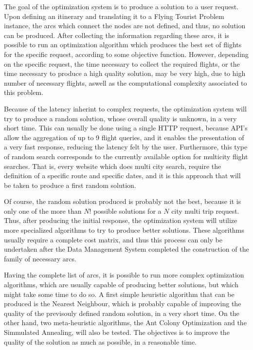 

The goal of the optimization system is to produce a solution to a user request.
Upon defining an itinerary and translating it to a Flying Tourist Problem instance, the arcs which connect the nodes are not defined, 
and thus, no solution can be produced.
After collecting the information regarding these arcs, it is possible to run 
an optimization algorithm which produces the best set of flights for the specific request,
according to some objective function.
However, depending on the specific request, the time necessary to collect 
the required flights, or the time necessary to produce a high quality solution, may be very high,
due to high number of necessary flights, aswell as the computational complexity associated to this problem.

Because of the latency inherint to complex requests,
the optimization system will try to produce a random solution, whose overall quality is unknown,
in a very short time. This can usually be done using a single HTTP request,
because API's allow the aggregation of up to 9 flight queries,
and it enables the presentation of a very fast response,
reducing the latency felt by the user.
Furthermore, this type of random search corresponds to the currently available option 
for multicity flight searches. That is, every website which does multi city search, 
require the definition of a specific route and specific dates,
and it is this approach that will be taken to produce a first random solution.

Of course, the random solution produced is probably not the best,
because it is only one of the more than $N!$ possible solutions for a $N$ city multi trip request.
Thus, after producing the initial response, the optimization system  
will utilize more specialized algorithms to try to produce better solutions.
These algorithms usually require a complete cost matrix, 
and thus this process can only be undertaken after the Data Management System completed the construction 
of the family of necessary arcs.

Having the complete list of arcs, it is possible to run more complex optimization algorithms,
which are usually capable of producing better solutions, but which might take some time to do so.
A first simple heuristic algorithm that can be produced is the Nearest Neighbour,
which is probably capable of improving the quality of the previsouly defined random solution,
in a very short time.
On the other hand, two meta-heuristic algorithms, the Ant Colony Optimization and the Simmulated Annealing, 
will also be tested.
The objectives is to improve the quality of the solution as much as possible,
in a reasonable time. 

